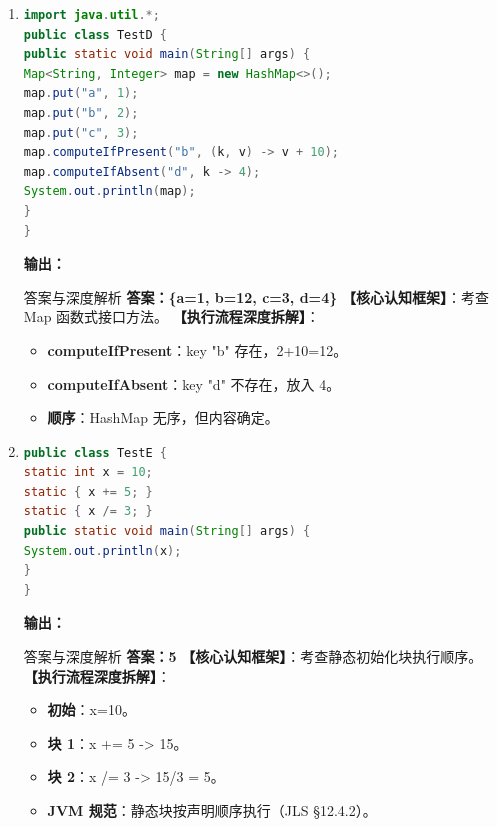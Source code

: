 ﻿\documentclass[12pt, a4paper]{ctexart}
\begin{document}
\begin{enumerate}[label=\arabic*., itemsep=1.5em]
	\item
	      \begin{lstlisting}[language=Java]
import java.util.*;
public class TestD {
public static void main(String[] args) {
Map<String, Integer> map = new HashMap<>();
map.put("a", 1);
map.put("b", 2);
map.put("c", 3);
map.computeIfPresent("b", (k, v) -> v + 10);
map.computeIfAbsent("d", k -> 4);
System.out.println(map);
}
}
    \end{lstlisting}
	      \textbf{输出：}\underline{\hspace{5cm}}
	      \begin{bluebox}{答案与深度解析}
		      \textbf{答案：\{a=1, b=12, c=3, d=4\}}
		      \textbf{【核心认知框架】}：考查 Map 函数式接口方法。
		      \textbf{【执行流程深度拆解】}：
		      \begin{itemize}[leftmargin=*, nosep]
			      \item \textbf{computeIfPresent}：key "b" 存在，2+10=12。
			      \item \textbf{computeIfAbsent}：key "d" 不存在，放入 4。
			      \item \textbf{顺序}：HashMap 无序，但内容确定。
		      \end{itemize}
	      \end{bluebox}

	\item
	      \begin{lstlisting}[language=Java]
public class TestE {
static int x = 10;
static { x += 5; }
static { x /= 3; }
public static void main(String[] args) {
System.out.println(x);
}
}
    \end{lstlisting}
	      \textbf{输出：}\underline{\hspace{5cm}}
	      \begin{bluebox}{答案与深度解析}
		      \textbf{答案：5}
		      \textbf{【核心认知框架】}：考查静态初始化块执行顺序。
		      \textbf{【执行流程深度拆解】}：
		      \begin{itemize}[leftmargin=*, nosep]
			      \item \textbf{初始}：x=10。
			      \item \textbf{块 1}：x += 5 -> 15。
			      \item \textbf{块 2}：x /= 3 -> 15/3 = 5。
			      \item \textbf{JVM 规范}：静态块按声明顺序执行（JLS §12.4.2）。
		      \end{itemize}
	      \end{bluebox}
\end{enumerate}
\end{document}
